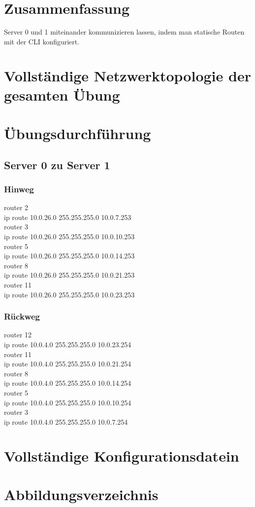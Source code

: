 \documentclass[a4paper]{article}
\begin{document}
\section{Zusammenfassung}
Server 0 und 1 miteinander kommunizieren lassen, indem man statische Routen mit der CLI konfiguriert.


\newpage

\section{Vollständige Netzwerktopologie der gesamten Übung}

\newpage

\section{Übungsdurchführung}

\subsection{Server 0 zu Server 1}

\subsubsection{Hinweg}
router 2\\
ip route 10.0.26.0 255.255.255.0 10.0.7.253 \\
router 3\\
ip route 10.0.26.0 255.255.255.0 10.0.10.253\\
router 5\\
ip route 10.0.26.0 255.255.255.0 10.0.14.253\\
router 8\\
ip route 10.0.26.0 255.255.255.0 10.0.21.253\\
router 11\\
ip route 10.0.26.0 255.255.255.0 10.0.23.253\\

\subsubsection{Rückweg}
router 12\\
ip route 10.0.4.0 255.255.255.0 10.0.23.254\\
router 11\\
ip route 10.0.4.0 255.255.255.0 10.0.21.254\\
router 8\\
ip route 10.0.4.0 255.255.255.0 10.0.14.254\\
router 5\\
ip route 10.0.4.0 255.255.255.0 10.0.10.254\\
router 3\\
ip route 10.0.4.0 255.255.255.0 10.0.7.254\\




\newpage

\section{Vollständige Konfigurationsdatein}

\newpage

\section{Abbildungsverzeichnis}

\listoffigures
\end{document}
